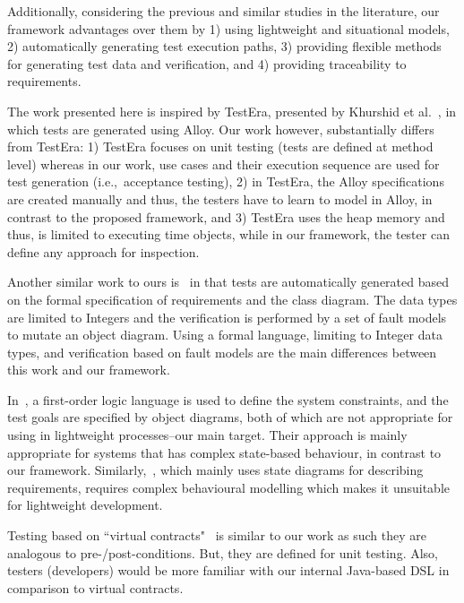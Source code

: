 Additionally, considering the previous and similar studies in the literature, our framework advantages over them by 1) using lightweight and situational models, 2) automatically generating test execution paths, 3) providing flexible methods for generating test data and verification, and 4) providing traceability to requirements.

The work presented here is inspired by TestEra, presented by Khurshid et al.~\cite{Khurshid2004}, in which tests are generated using Alloy. Our work however, substantially differs from TestEra: 1) TestEra focuses on unit testing (tests are defined at method level) whereas in our work, use cases and their execution sequence are used for test generation (i.e.,\ acceptance testing), 2) in TestEra, the Alloy specifications are created manually and thus, the testers have to learn to model in Alloy, in contrast to the proposed framework, and 3) TestEra uses the heap memory and thus, is limited to executing time objects, while in our framework, the tester can define any approach for inspection.

Another similar work to ours is~\cite{Kaplan2008} in that tests are automatically generated based on the formal specification of requirements and the class diagram. The data types are limited to Integers and the verification is performed by a set of fault models to mutate an object diagram. Using a formal language, limiting to Integer data types, and verification based on fault models are the main differences between this work and our framework.

In~\cite{Scheetz1999}, a first-order logic language is used to define the system constraints, and the test goals are specified by object diagrams, both of which are not appropriate for using in lightweight processes--our main target. Their approach is mainly appropriate for systems that has complex state-based behaviour, in contrast to our framework.
Similarly,~\cite{Cavarra2002}, which mainly uses state diagrams for describing requirements, requires complex behavioural modelling which makes it unsuitable for lightweight development.

Testing based on ``virtual contracts"~\cite{Engels2006} is similar to our work as such they are analogous to pre-/post-conditions. But, they are defined for unit testing. Also, testers (developers) would be more familiar with our internal Java-based DSL in comparison to virtual contracts.